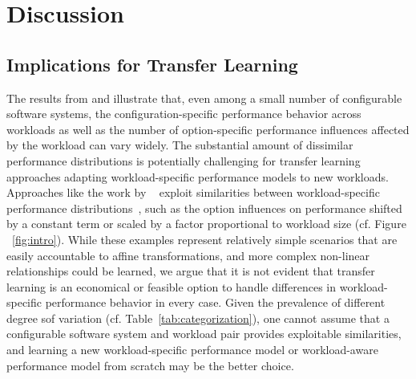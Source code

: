 {\color{blue!50!black}
\section{Discussion}
\subsection{Implications for Transfer Learning}
The results from  and  illustrate that, even among a small number of configurable software systems, the configuration-specific performance behavior across workloads as well as the number of option-specific performance influences affected by the workload can vary widely. The substantial amount of dissimilar performance distributions is potentially challenging for transfer learning approaches adapting workload-specific performance models to new workloads. Approaches like the work by ~\citeauthor{jamshidi_learning_2018} exploit similarities between workload-specific performance distributions~\cite{jamshidi_learning_2018}, such as the option influences on performance shifted by a constant term or scaled by a factor proportional to workload size (cf. Figure ~\ref{fig:intro}). While these examples represent relatively simple scenarios that are easily accountable to affine transformations, and more complex non-linear relationships could be learned, we argue that it is not evident that transfer learning is an economical or feasible option to handle differences in workload-specific performance behavior in every case. Given the prevalence of different degree sof variation (cf. Table~\ref{tab:categorization}), one cannot assume that a configurable software system and workload pair provides exploitable similarities, and learning a new workload-specific performance model or workload-aware performance model from scratch may be the better choice.

}
